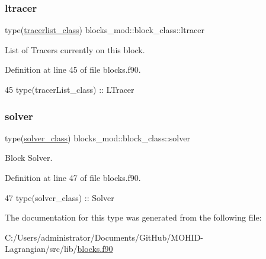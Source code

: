 \subsubsection{\texorpdfstring{ltracer}{ltracer}}
{\footnotesize\ttfamily type(\mbox{\hyperlink{structtracer__list__mod_1_1tracerlist__class}{tracerlist\+\_\+class}}) blocks\+\_\+mod\+::block\+\_\+class\+::ltracer\hspace{0.3cm}{\ttfamily [private]}}



List of Tracers currently on this block. 



Definition at line 45 of file blocks.\+f90.


\begin{DoxyCode}
45         \textcolor{keywordtype}{type}(tracerList\_class) :: LTracer
\end{DoxyCode}
\mbox{\label{structblocks__mod_1_1block__class_a081258113128b3bcdefdbeac4bc5d039}} 
\subsubsection{\texorpdfstring{solver}{solver}}
{\footnotesize\ttfamily type(\mbox{\hyperlink{structsolver__mod_1_1solver__class}{solver\+\_\+class}}) blocks\+\_\+mod\+::block\+\_\+class\+::solver\hspace{0.3cm}{\ttfamily [private]}}



Block Solver. 



Definition at line 47 of file blocks.\+f90.


\begin{DoxyCode}
47         \textcolor{keywordtype}{type}(solver\_class)     :: Solver
\end{DoxyCode}


The documentation for this type was generated from the following file\+:\begin{DoxyCompactItemize}
\item 
C\+:/\+Users/administrator/\+Documents/\+Git\+Hub/\+M\+O\+H\+I\+D-\/\+Lagrangian/src/lib/\mbox{\hyperlink{blocks_8f90}{blocks.\+f90}}\end{DoxyCompactItemize}
